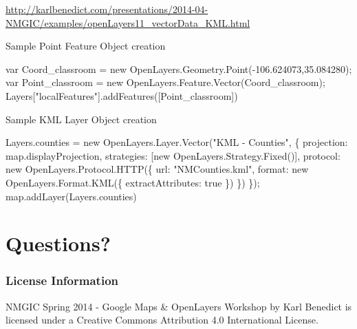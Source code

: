 \documentclass[]{article}
\newenvironment{Shaded}{}{}
\newcommand{\NormalTok}[1]{{#1}}
\begin{document}
\url{http://karlbenedict.com/presentations/2014-04-NMGIC/examples/openLayers11_vectorData_KML.html}

Sample Point Feature Object creation

\begin{Shaded}
\begin{Highlighting}[numbers=left,,]
    \NormalTok{var Coord_classroom = new OpenLayers.Geometry.Point(-106.624073,35.084280);}
    \NormalTok{var Point_classroom = new OpenLayers.Feature.Vector(Coord_classroom);}
    \NormalTok{Layers["localFeatures"].addFeatures([Point_classroom])}
\end{Highlighting}
\end{Shaded}

Sample KML Layer Object creation

\begin{Shaded}
\begin{Highlighting}[numbers=left,,]
    \NormalTok{Layers.counties = new OpenLayers.Layer.Vector("KML - Counties", \{}
        \NormalTok{projection: map.displayProjection,}
        \NormalTok{strategies: [new OpenLayers.Strategy.Fixed()],}
        \NormalTok{protocol: new OpenLayers.Protocol.HTTP(\{}
            \NormalTok{url: "NMCounties.kml",}
            \NormalTok{format: new OpenLayers.Format.KML(\{}
                \NormalTok{extractAttributes: true}
            \NormalTok{\})}
        \NormalTok{\})}
    \NormalTok{\});}
    \NormalTok{map.addLayer(Layers.counties)}
\end{Highlighting}
\end{Shaded}

\section{Questions?}\label{questions}

\subsubsection{License Information}\label{license-information}

{NMGIC Spring 2014 - Google Maps \& OpenLayers Workshop} by Karl
Benedict is licensed under a Creative Commons Attribution 4.0
International License.
\end{document}
